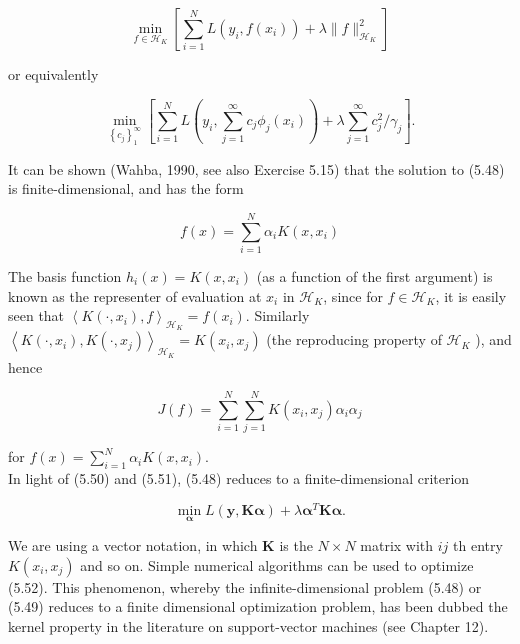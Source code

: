 \documentclass[10pt]{article}
\begin{document}
\begin{equation*}
\min _{f \in \mathcal{H}_{K}}\left[\sum_{i=1}^{N} L\left(y_{i}, f\left(x_{i}\right)\right)+\lambda\|f\|_{\mathcal{H}_{K}}^{2}\right] \tag{5.48}
\end{equation*}


or equivalently


\begin{equation*}
\min _{\left\{c_{j}\right\}_{1}^{\infty}}\left[\sum_{i=1}^{N} L\left(y_{i}, \sum_{j=1}^{\infty} c_{j} \phi_{j}\left(x_{i}\right)\right)+\lambda \sum_{j=1}^{\infty} c_{j}^{2} / \gamma_{j}\right] . \tag{5.49}
\end{equation*}


It can be shown (Wahba, 1990, see also Exercise 5.15) that the solution to (5.48) is finite-dimensional, and has the form


\begin{equation*}
f(x)=\sum_{i=1}^{N} \alpha_{i} K\left(x, x_{i}\right) \tag{5.50}
\end{equation*}


The basis function $h_{i}(x)=K\left(x, x_{i}\right)$ (as a function of the first argument) is known as the representer of evaluation at $x_{i}$ in $\mathcal{H}_{K}$, since for $f \in \mathcal{H}_{K}$, it is easily seen that $\left\langle K\left(\cdot, x_{i}\right), f\right\rangle_{\mathcal{H}_{K}}=f\left(x_{i}\right)$. Similarly $\left\langle K\left(\cdot, x_{i}\right), K\left(\cdot, x_{j}\right)\right\rangle_{\mathcal{H}_{K}}= K\left(x_{i}, x_{j}\right)$ (the reproducing property of $\mathcal{H}_{K}$ ), and hence


\begin{equation*}
J(f)=\sum_{i=1}^{N} \sum_{j=1}^{N} K\left(x_{i}, x_{j}\right) \alpha_{i} \alpha_{j} \tag{5.51}
\end{equation*}


for $f(x)=\sum_{i=1}^{N} \alpha_{i} K\left(x, x_{i}\right)$.\\
In light of (5.50) and (5.51), (5.48) reduces to a finite-dimensional criterion


\begin{equation*}
\min _{\boldsymbol{\alpha}} L(\mathbf{y}, \mathbf{K} \boldsymbol{\alpha})+\lambda \boldsymbol{\alpha}^{T} \mathbf{K} \boldsymbol{\alpha} . \tag{5.52}
\end{equation*}


We are using a vector notation, in which $\mathbf{K}$ is the $N \times N$ matrix with $i j$ th entry $K\left(x_{i}, x_{j}\right)$ and so on. Simple numerical algorithms can be used to optimize (5.52). This phenomenon, whereby the infinite-dimensional problem (5.48) or (5.49) reduces to a finite dimensional optimization problem, has been dubbed the kernel property in the literature on support-vector machines (see Chapter 12).
\end{document}
